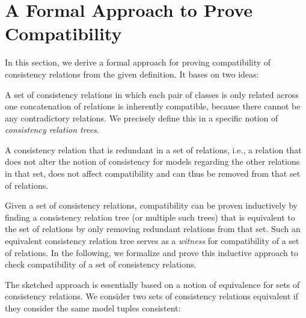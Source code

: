 \section{A Formal Approach to Prove Compatibility}
\label{chap:compatibility:formal_approach}


In this section, we derive a formal approach for proving compatibility of consistency relations from the given definition.
It bases on two ideas:
\begin{longenumerate}
    \item A set of consistency relations in which each pair of classes is only related across one concatenation of relations is inherently compatible, because there cannot be any contradictory relations. We precisely define this in a specific notion of \emph{consistency relation trees}.
    \item A consistency relation that is redundant in a set of relations, i.e., a relation that does not alter the notion of consistency for models regarding the other relations in that set, does not affect compatibility and can thus be removed from that set of relations. %
\end{longenumerate}
Given a set of consistency relations, compatibility can be proven inductively by finding a consistency relation tree (or multiple such trees) that is equivalent to the set of relations by only removing redundant relations from that set.
Such an equivalent consistency relation tree serves as a \emph{witness} for compatibility of a set of relations.
In the following, we formalize and prove this inductive approach to check compatibility of a set of consistency relations.

The sketched approach is essentially based on a notion of equivalence for sets of consistency relations.
We consider two sets of consistency relations equivalent if they consider the same model tuples consistent:


